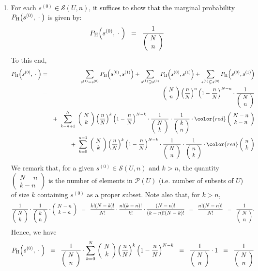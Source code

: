 \begin{enumerate}

\item
For each $s^{(0)} \in \mathcal{S}(U,n)$, it suffices to show that the marginal probability
$P_{\textnormal{H}}\!\left(s^{(0)},\;\cdot\;\right)$
is given by:
\begin{equation*}
P_{\textnormal{H}}\!\left(s^{(0)},\;\cdot\;\right) \;\; = \;\; \dfrac{1}{\left(\!\begin{array}{c} N \\ n \end{array}\!\right)}
\end{equation*}
To this end,
\begin{eqnarray*}
P_{\textnormal{H}}\!\left(s^{(0)},\;\cdot\;\right)
&=&
\underset{s^{(1)} = s^{(0)}}{\sum}\,P_{\textnormal{H}}\!\left(s^{(0)},s^{(1)}\right)
+ \underset{s^{(1)} \supsetneq s^{(0)}}{\sum}\,P_{\textnormal{H}}\!\left(s^{(0)},s^{(1)}\right)
+ \underset{s^{(1)} \subsetneq s^{(0)}}{\sum}\,P_{\textnormal{H}}\!\left(s^{(0)},s^{(1)}\right)
\\
&=&
\PKn\cdot\dfrac{1}{\NCn}
\\ &&
+\;\;\overset{N}{\underset{k = n+1}{\sum}}\;\PKk\cdot\dfrac{1}{\NCk}\cdot\dfrac{1}{\kCn}\cdot{\color{red}\left(\!\begin{array}{c} N - n \\ k - n \end{array}\!\right)}
\\ &&
+\;\;\overset{n-1}{\underset{k = 0}{\sum}}\;\PKk\cdot\dfrac{1}{\NCn}\cdot\dfrac{1}{\nCk}\cdot{\color{red}\left(\!\begin{array}{c} n \\ k \end{array}\!\right)}
\end{eqnarray*}
We remark that, for a given $s^{(0)} \in \mathcal{S}(U,n)$ and $k > n$,
the quantity $\left(\!\begin{array}{c} N - n \\ k - n \end{array}\!\right)$
is the number of elements in $\mathcal{P}(U)$ (i.e. number of subsets of $U$) of size $k$ containing $s^{(0)}$ as a proper subset.
Note also that, for $k > n$,
\begin{equation*}
\dfrac{1}{\NCk}\cdot\dfrac{1}{\kCn}\cdot\left(\!\begin{array}{c} N - n \\ k - n \end{array}\!\right)
\;\; = \;\; \dfrac{k!(N-k)!}{N!} \cdot \dfrac{n!(k-n)!}{k!} \cdot \dfrac{(N-n)!}{(k-n)!(N-k)!}
\;\; = \;\; \dfrac{n!(N-n)!}{N!}
\;\; = \;\; \dfrac{1}{\NCn}.
\end{equation*}
Hence, we have
\begin{equation*}
P_{\textnormal{H}}\!\left(s^{(0)},\;\cdot\;\right)
\;\; = \;\; \dfrac{1}{\NCn}\cdot\overset{N}{\underset{k=0}{\sum}}\,\PKk
\;\; = \;\; \dfrac{1}{\NCn} \cdot 1 
\;\; = \;\; \dfrac{1}{\NCn}
\end{equation*}


\end{enumerate}
